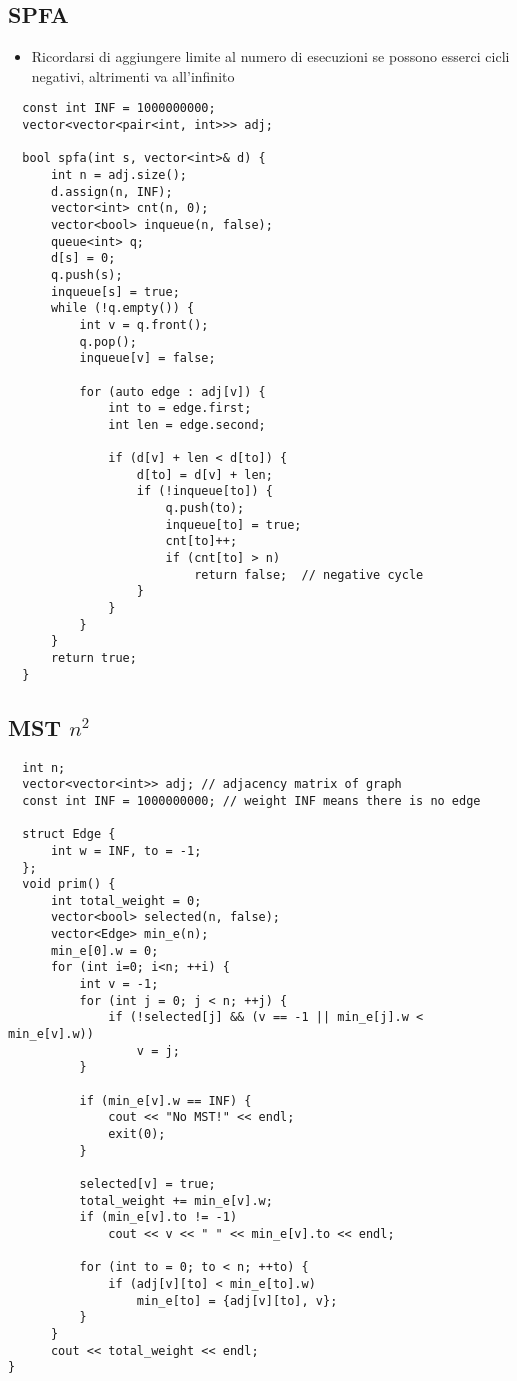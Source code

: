 \documentclass{article}
\begin{document}
\subsection{SPFA}
\begin{itemize}
    \item Ricordarsi di aggiungere limite al numero di esecuzioni se possono esserci cicli negativi, altrimenti va all'infinito
\end{itemize}
\begin{lstlisting}
  const int INF = 1000000000;
  vector<vector<pair<int, int>>> adj;

  bool spfa(int s, vector<int>& d) {
      int n = adj.size();
      d.assign(n, INF);
      vector<int> cnt(n, 0);
      vector<bool> inqueue(n, false);
      queue<int> q;
      d[s] = 0;
      q.push(s);
      inqueue[s] = true;
      while (!q.empty()) {
          int v = q.front();
          q.pop();
          inqueue[v] = false;

          for (auto edge : adj[v]) {
              int to = edge.first;
              int len = edge.second;

              if (d[v] + len < d[to]) {
                  d[to] = d[v] + len;
                  if (!inqueue[to]) {
                      q.push(to);
                      inqueue[to] = true;
                      cnt[to]++;
                      if (cnt[to] > n)
                          return false;  // negative cycle
                  }
              }
          }
      }
      return true;
  }
\end{lstlisting}

\subsection{MST $n^2$}
\begin{lstlisting}
  int n;
  vector<vector<int>> adj; // adjacency matrix of graph
  const int INF = 1000000000; // weight INF means there is no edge

  struct Edge {
      int w = INF, to = -1;
  };
  void prim() {
      int total_weight = 0;
      vector<bool> selected(n, false);
      vector<Edge> min_e(n);
      min_e[0].w = 0;
      for (int i=0; i<n; ++i) {
          int v = -1;
          for (int j = 0; j < n; ++j) {
              if (!selected[j] && (v == -1 || min_e[j].w < min_e[v].w))
                  v = j;
          }

          if (min_e[v].w == INF) {
              cout << "No MST!" << endl;
              exit(0);
          }

          selected[v] = true;
          total_weight += min_e[v].w;
          if (min_e[v].to != -1)
              cout << v << " " << min_e[v].to << endl;

          for (int to = 0; to < n; ++to) {
              if (adj[v][to] < min_e[to].w)
                  min_e[to] = {adj[v][to], v};
          }
      }
      cout << total_weight << endl;
}
\end{lstlisting}
\end{document}
